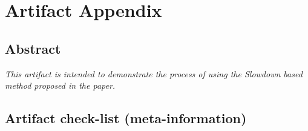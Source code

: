 \documentclass{sigplanconf}
\begin{document}


\appendix
\section{Artifact Appendix}

\subsection{Abstract}

{\em This artifact is intended to demonstrate the process of using the Slowdown based method proposed in the paper.}

\subsection{Artifact check-list (meta-information)}
\end{document}
